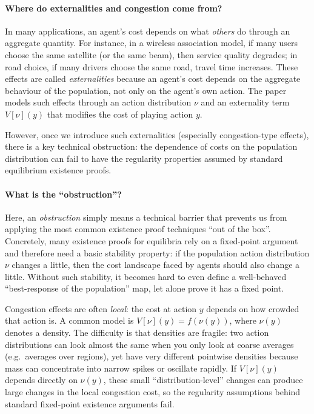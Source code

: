 \paragraph{Where do externalities and congestion come from?}
In many applications, an agent's cost depends on what \emph{others} do through an aggregate quantity. For instance, in a
wireless association model, if many users choose the same satellite (or the same beam), then service quality degrades;
in road choice, if many drivers choose the same road, travel time increases. These effects are called \emph{externalities}
because an agent's cost depends on the aggregate behaviour of the population, not only on the agent's own action.
The paper models such effects through an action distribution $\nu$ and an externality term $V[\nu](y)$ that modifies the
cost of playing action $y$.

However, once we introduce such externalities (especially congestion-type effects), there is a key technical
obstruction: the dependence of costs on the population distribution can fail to have the regularity properties assumed
by standard equilibrium existence proofs.

\paragraph{What is the ``obstruction''?}
Here, an \emph{obstruction} simply means a technical barrier that prevents us from applying the most common existence
proof techniques ``out of the box''. Concretely, many existence proofs for equilibria rely on a fixed-point argument and
therefore need a basic stability property: if the population action distribution $\nu$ changes a little, then the cost
landscape faced by agents should also change a little. Without such stability, it becomes hard to even define a
well-behaved ``best-response of the population'' map, let alone prove it has a fixed point.

Congestion effects are often \emph{local}: the cost at action $y$ depends on how crowded that action is. A common model is
$V[\nu](y)=f(\nu(y))$, where $\nu(y)$ denotes a density. The difficulty is that densities are fragile: two action
distributions can look almost the same when you only look at coarse averages (e.g.\ averages over regions), yet have very
different pointwise densities because mass can concentrate into narrow spikes or oscillate rapidly. If $V[\nu](y)$ depends
directly on $\nu(y)$, these small ``distribution-level'' changes can produce large changes in the local congestion cost,
so the regularity assumptions behind standard fixed-point existence arguments fail.

